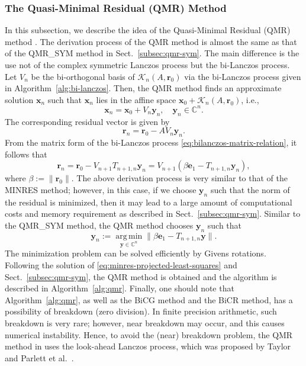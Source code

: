 \subsubsection{{The Quasi-Minimal Residual (QMR) Method}}\label{subsec:qmr-method}
{In this subsection, we describe the idea of the Quasi-Minimal Residual (QMR) method . The derivation process of the QMR method is almost the same as that of the QMR\_SYM method in Sect.\ \ref{subsec:qmr-sym}. The main difference is the use not of the complex symmetric Lanczos process but the bi-Lanczos process. Let $V_n$ be the bi-orthogonal basis of $\mathcal K_n(A,\bm r_0)$ via the bi-Lanczos process given in Algorithm\ \ref{alg:bi-lanczos}. Then, the QMR method finds an approximate solution $\bm x_n$ such that $\bm x_n$ lies in the affine space $\bm x_0+\mathcal K_n(A,\bm r_0)$, i.e.,}
\[\bm x_n=\bm x_0+V_n\bm y_n,\quad\bm y_n\in\mathbb C^n.\]
{The corresponding residual vector is given by}
\[\bm r_n=\bm r_0-AV_n\bm y_n.\]
{From the matrix form of the bi-Lanczos process \eqref{eq:bilanczos-matrix-relation}, it follows that}
\[\bm r_n=\bm r_0-V_{n+1}T_{n+1,n}\bm y_n=V_{n+1}(\beta\bm e_1-T_{n+1,n}\bm y_n),\]
{where $\beta:=\|\bm r_0\|$. The above derivation process is very similar to that of the MINRES method; however, in this case, if we choose $\bm y_n$ such that the norm of the residual is minimized, then it may lead to a large amount of computational costs and memory requirement as described in Sect.\ \ref{subsec:qmr-sym}. Similar to the QMR\_SYM method, the QMR method chooses $\bm y_n$ such that}
\begin{equation}\label{eq:qmr-projected-minimization}\bm y_n:=\operatorname*{arg\,min}_{\bm y\in\mathbb C^n}\|\beta\bm e_1-T_{n+1,n}\bm y\|.\end{equation}
{The minimization problem can be solved efficiently by Givens rotations. Following the solution of \eqref{eq:minres-projected-least-squares} and Sect.\ \ref{subsec:qmr-sym}, the QMR method is obtained and the algorithm is described in Algorithm\ \ref{alg:qmr}.}
{Finally, one should note that Algorithm\ \ref{alg:qmr}, as well as the BiCG method and the BiCR method, has a possibility of breakdown (zero division). In finite precision arithmetic, such breakdown is very rare; however, near breakdown may occur, and this causes numerical instability. Hence, to avoid the (near) breakdown problem, the QMR method in  uses the look-ahead Lanczos process, which was proposed by Taylor  and Parlett et al.\ .}

